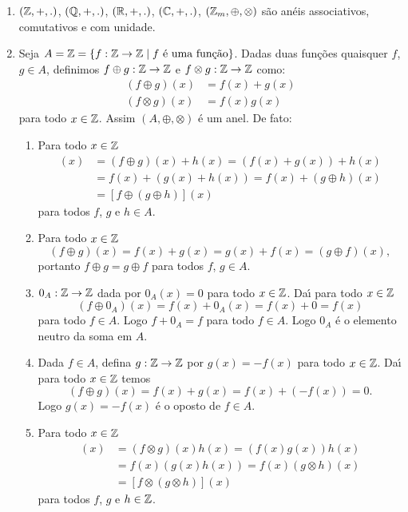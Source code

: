 \begin{exemplos}
	\begin{enumerate}[label={\arabic*})]
		\item $(\mathbb{Z},+,.)$, $(\mathbb{Q},+,.)$, $(\mathbb{R},+,.)$, $(\mathbb{C},+,.)$, $(\mathbb{Z}_m, \oplus, \otimes)$ s{\~a}o an{\'e}is associativos, comutativos e com unidade.

		\item  Seja $A = \z =\{f : \z \to \z \mid f \mbox{ {\'e} uma fun{\c c}{\~a}o}\}$. Dadas duas fun{\c c}{\~o}es quaisquer $f$, $g \in A$, definimos $f\oplus g:\mathbb{Z} \to \mathbb{Z}$ e $f \otimes g:\mathbb{Z} \to \mathbb{Z}$ como:
		\begin{align*}
			(f\oplus g)(x) &= f(x) + g(x)\\
			(f\otimes g)(x) &= f(x)g(x)
		\end{align*}
		para todo $x \in \mathbb{Z}$. Assim $(A, \oplus, \otimes)$ \'e um anel. De fato:
		\begin{enumerate}[label={\roman*})]
			\item Para todo $x \in \mathbb{Z}$
			\begin{align*}
				[(f \oplus g) \oplus h](x) &= (f \oplus g)(x) + h(x) = (f(x) + g(x)) + h(x)\\ 
				&= f(x) + (g(x) + h(x)) = f(x) + (g \oplus h)(x)\\ &= [f \oplus (g \oplus h)](x)
			\end{align*}
			para todos $f$, $g$ e $h \in A$.
			
			\item Para todo $x \in \mathbb{Z}$
			\[
				(f\oplus g)(x) = f(x) + g(x) = g(x) + f(x) = (g\oplus f)(x),
			\]
			portanto $f\oplus g = g\oplus f$ para todos $f$, $g \in A$.

			\item $0_A : \mathbb{Z} \to \mathbb{Z}$ dada por $0_A(x) = 0$ para todo $x \in \mathbb{Z}$. Da{\'\i} para todo $x \in \mathbb{Z}$
			\[
				(f \oplus 0_A)(x) = f(x) + 0_A(x) = f(x) + 0 = f(x)
			\]
			para todo $f \in A$. Logo $f + 0_A = f$ para todo $f \in A$. Logo $0_A$ \'e o elemento neutro da soma em $A$.

			\item Dada $f \in A$, defina $g : \mathbb{Z} \to \mathbb{Z}$ por $g(x) = -f(x)$ para todo $x \in \mathbb{Z}$. Da{\'\i} para todo $x \in \mathbb{Z}$ temos
			\[
				(f \oplus g)(x) = f(x) + g(x) = f(x) + (-f(x)) = 0.
			\]
			Logo $g(x) = -f(x)$ \'e o oposto de $f \in A$.

			\item Para todo $x \in \mathbb{Z}$
			\begin{align*}
				[(f \otimes g)\otimes h](x) &= (f \otimes g)(x)h(x) = (f(x)g(x))h(x)\\ &= f(x)(g(x)h(x)) = f(x)(g \otimes h)(x)\\ &= [f\otimes (g \otimes h)](x)
			\end{align*}
			para todos $f$, $g$ e $h \in \mathbb{Z}$.


\end{enumerate}
\end{enumerate}
\end{exemplos}
